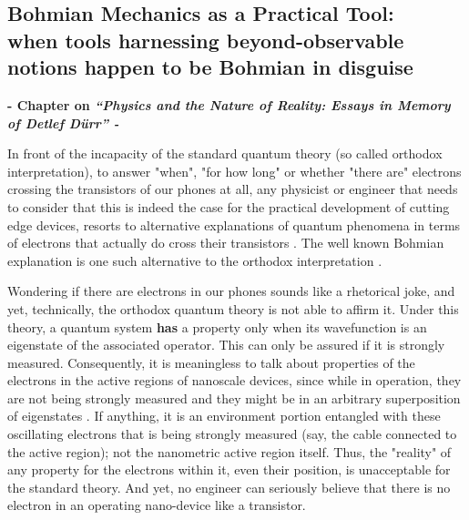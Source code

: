\documentclass[11pt, a4paper]{article} %
\begin{document}
\newpage
{}
\setcounter{page}{1}
\begin{center}
\section*{ Bohmian Mechanics as a Practical Tool:\\ \vspace{0.2cm} \small when tools harnessing beyond-observable notions happen to be Bohmian in disguise }\vspace{-0.4cm}
{\bf \small - Chapter on {\em “Physics and the Nature of Reality: Essays in Memory of Detlef Dürr” - }}\vspace{-0.32cm}
\end{center}

\hspace*{4mm} In front of the incapacity of the standard quantum theory (so called orthodox interpretation), to answer "when", "for how long" or whether "there are" electrons crossing the transistors of our phones at all, any physicist or engineer that needs to consider that this is indeed the case for the practical development of cutting edge devices, resorts to alternative explanations of quantum phenomena in terms of electrons that actually do cross their transistors \cite{where}. The well known Bohmian explanation is one such alternative to the orthodox interpretation \cite{Bohm,Holland, Durr,JordiXavier}. \vspace{-0.1cm}

Wondering if there are electrons in our phones sounds like a rhetorical joke, and yet, technically, the orthodox quantum theory is not able to affirm it. Under this theory, a quantum system {\bf has} a property only when its wavefunction is an eigenstate of the associated operator. This can only be assured if it is strongly measured. Consequently, it is meaningless to talk about properties of the electrons in the active regions of nanoscale devices, since while in operation, they are not being strongly measured and they might be in an arbitrary superposition of eigenstates  \cite{where}. If anything, it is an environment portion entangled with these oscillating electrons that is being strongly measured (say, the cable connected to the active region); not the nanometric active region itself. Thus, the "reality" of any property for the electrons within it, even their position, is unacceptable for the standard theory. And yet, no engineer can seriously believe that there is no electron in an operating nano-device like a transistor.\vspace{-0.1cm} %
\end{document}
